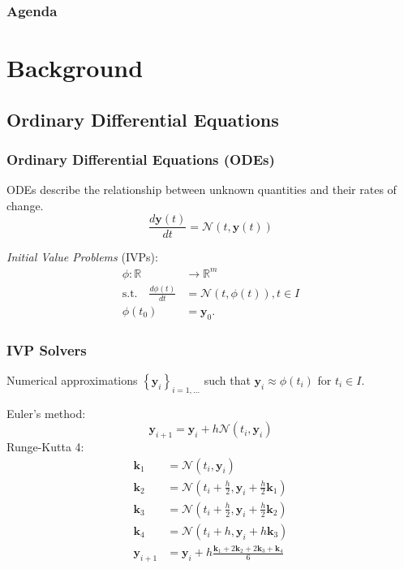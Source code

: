 \documentclass[t]{beamer}
\newcommand{\R}{\mathbb{R}}
\begin{document}
\begin{frame}
\frametitle{Agenda}
\tableofcontents
\end{frame}

\section{Background}

\subsection{Ordinary Differential Equations}

\begin{frame}
    \frametitle{Ordinary Differential Equations (ODEs)}
    ODEs describe the relationship between unknown quantities and their rates of change.
    \begin{equation}
    \frac{d \bm{y}\left( t \right) }{d t} = \mathcal{N}\left( t, \bm{y}\left( t \right)  \right) 
    \end{equation}\pause

    \emph{Initial Value Problems} (IVPs):
    \begin{align*}
	\phi :\R&\to \R^{m} \\
	\text{s.t.} \quad \frac{d \phi\left( t \right) }{d t} &= \mathcal{N}\left( t, \phi\left( t \right)  \right), t\in I \\
		    \phi(t_0) &= \bm{y}_0
    .\end{align*}
\end{frame}

\begin{frame}
    \frametitle{IVP Solvers}
    Numerical approximations $\left\{ \bm{y}_i \right\}_{i=1,\ldots}$ such that $\bm{y}_i \approx \phi(t_i)$ for $t_i \in I$. \pause

    Euler's method: \[
\bm{y}_{i+1} = \bm{y}_{i} + h\mathcal{N}\left( t_i, \bm{y}_i \right)
    \] \pause
    Runge-Kutta 4:
    \begin{align*}
	\bm{k}_1 &= \mathcal{N}\left( t_i , \bm{y}_i \right)  \\
	\bm{k}_2 &= \mathcal{N}\left( t_i+\frac{h}{2}, \bm{y}_i + \frac{h}{2}\bm{k}_1 \right)  \\
	\bm{k}_3 &= \mathcal{N}\left( t_i+\frac{h}{2}, \bm{y}_i + \frac{h}{2}\bm{k}_2 \right)  \\
	\bm{k}_4 &= \mathcal{N}\left( t_i+h, \bm{y}_i + h \bm{k}_3 \right) \\
	\bm{y}_{i+1} &= \bm{y}_i + h \frac{\bm{k}_1 + 2\bm{k}_2 + 2 \bm{k}_3 + \bm{k}_4}{6}
    \end{align*}
\end{frame}
\end{document}

